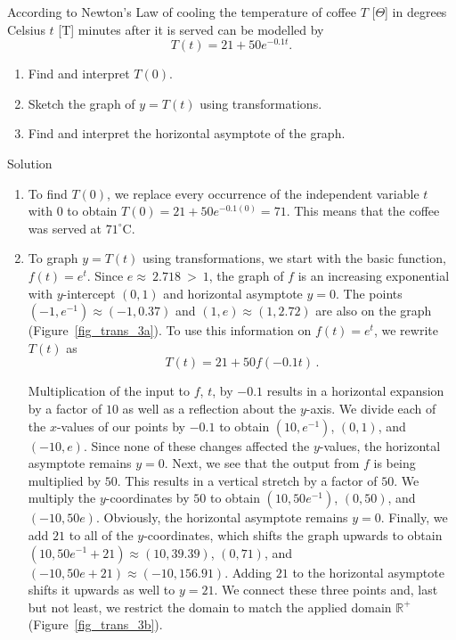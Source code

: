 \begin{example} 
 \label{exptempex} According to Newton's Law of cooling the temperature of coffee $T$ [$\Theta$] in degrees Celsius $t$ [T] minutes after it is served can be modelled by 
 $$T(t) = 21 + 50 e^{-0.1 t}.$$

\begin{enumerate}

\item  Find and interpret $T(0)$.

\item  Sketch the graph of $y = T(t)$ using transformations.

\item  Find and interpret the horizontal asymptote of the graph.

\end{enumerate}


Solution 

\begin{enumerate}

\item  To find $T(0)$, we replace every occurrence of the independent variable $t$ with $0$ to obtain  $T(0) =21 + 50 e^{-0.1 (0)} = 71$.  This means that the coffee was served at $71^{\circ}\mbox{C}$.

\item  To graph $y = T(t)$ using transformations, we start with the basic function, $f(t)=e^{t}$.  Since $e \approx~2.718~>~1$, the graph of $f$ is an increasing exponential with $y$-intercept $(0,1)$ and horizontal asymptote $y = 0$.  The points $\left(-1, e^{-1}\right) \approx (-1,0.37)$ and $(1,e) \approx (1,2.72)$ are also on the graph (Figure~\ref{fig_trans_3a}).  To use this information on $f(t)=e^{t}$, we rewrite $T(t)$ as 
 \[T(t) = 21+50 f(-0.1t)\,.\]  


Multiplication of the input to $f$, $t$, by $-0.1$ results in a horizontal expansion by a factor of $10$ as well as a reflection about the $y$-axis.  We divide each of the $x$-values of our points by $-0.1$  to obtain $\left(10,e^{-1}\right)$, $(0,1)$, and $\left(-10, e\right)$.  Since none of these changes affected the $y$-values, the horizontal asymptote remains $y = 0$.  Next, we see that the output from $f$ is being multiplied by $50$.  This results in a vertical stretch by a factor of $50$.  We multiply the $y$-coordinates by $50$ to obtain $\left(10,50e^{-1}\right)$, $(0,50)$, and $\left(-10, 50e\right)$. Obviously,  the horizontal asymptote remains $y=0$.  Finally, we add $21$ to all of the $y$-coordinates, which shifts the graph upwards to obtain $\left(10,50e^{-1} + 21\right) \approx (10, 39.39)$, $(0,71)$, and $\left(-10, 50e+ 21\right) \approx (-10,156.91)$.  Adding $21$ to the horizontal asymptote shifts it upwards as well to $y=21$.  We connect these three points and, last but not least, we restrict the domain to match the applied domain $\mathbb{R}^+$ (Figure~\ref{fig_trans_3b}).  




\end{enumerate}
\end{example}
